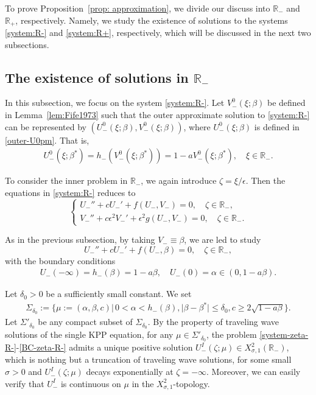 \documentclass[11pt,a4paper]{article}
\numberwithin{equation}{section}
\numberwithin{figure}{section}
\newcommand\bea{\begin{eqnarray}}
\newcommand\eea{\end{eqnarray}}
\newcommand\beaa{\begin{eqnarray*}}
\newcommand\eeaa{\end{eqnarray*}}
\begin{document}
To prove Proposition~\ref{prop: approximation}, we divide our discuss into $\mathbb{R}_-$ and  $\mathbb{R}_+$, respectively. Namely,
we study the existence of solutions to the systems \eqref{system:R-} and \eqref{system:R+}, respectively, which will be discussed in the next two subsections.

\subsection{The existence of solutions in $\mathbb{R}_{-}$}

In this subsection, we focus on the system \eqref{system:R-}.
Let $V^0_{-}(\xi;\beta)$ be defined in Lemma~\ref{lem:Fife1973} such that
the outer approximate solution to \eqref{system:R-} can be represented by
$(U^0_{-}(\xi;\beta), V^0_{-}(\xi;\beta))$, where $U^0_{-}(\xi;\beta)$ is defined in \eqref{outer-U0pm}.
That is,
\beaa
U^0_{-}(\xi;\beta^*)=h_{-}(V^0_{-}(\xi;\beta^*))=1-aV^0_{-}(\xi;\beta^*),\quad \xi\in \mathbb{R_-}.
\eeaa

To consider the inner problem in $\mathbb{R}_-$, we again introduce $\zeta=\xi/\epsilon$.
Then the equations in \eqref{system:R-} reduces to
\begin{equation}\label{system-zeta-R-}
\begin{cases}
U_-''+cU_-'+f(U_-,V_-)=0,\quad \zeta\in\mathbb{R}_-,\\
V_-''+c\epsilon^2 V_-'+\epsilon^2 g(U_-,V_-)=0,\quad \zeta\in\mathbb{R}_-.
\end{cases}
\end{equation}

As in the previous subsection, by taking $V_-\equiv\beta$, we are led to study
\begin{equation}\label{system-zeta-R-}
U_{-}''+cU_{-}'+f(U_{-},\beta)=0,\quad \zeta\in\mathbb{R}_-,
\end{equation}
with the boundary conditions
\bea\label{BC-zeta-R-}
U_-(-\infty)=h_-(\beta)=1-a\beta,\quad U_-(0)=\alpha\in(0,1-a\beta).
\eea

Let $\delta_0>0$ be a sufficiently small constant. We set
\beaa
\Sigma_{\delta_0}:=\{\mu:=(\alpha,\beta,c)|\, 0<\alpha<h_-(\beta), |\beta-\beta^*|\leq \delta_0, c\geq 2\sqrt{1-a\beta} \}.
\eeaa
Let $\Sigma'_{\delta_0}$ be any compact subset of $\Sigma_{\delta_0}$.
By the property of traveling wave solutions of the single KPP equation,
for any $\mu\in\Sigma'_{\delta_0}$,
the problem \eqref{system-zeta-R-}-\eqref{BC-zeta-R-} admits a unique positive solution $U_-^{I}(\zeta;\mu)\in X^2_{\sigma,1}(\mathbb{R}_-)$, which is
nothing but a truncation of traveling wave solutions, 
for some small $\sigma>0$ and
 $U_-^{I}(\zeta;\mu)$ decays exponentially at $\zeta=-\infty$. Moreover, we can easily verify that $U_-^{I}$ is continuous on $\mu$ in the $X^2_{\sigma,1}$-topology.
\end{document}
